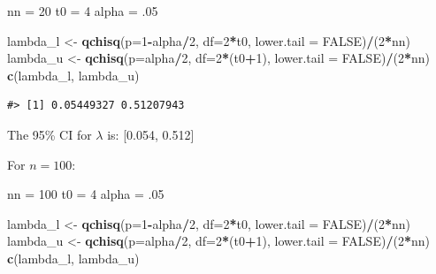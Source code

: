 \documentclass[11pt,]{article}
\newenvironment{Shaded}{\begin{snugshade}}{\end{snugshade}}
\newcommand{\DataTypeTok}[1]{\textcolor[rgb]{0.13,0.29,0.53}{#1}}
\newcommand{\DecValTok}[1]{\textcolor[rgb]{0.00,0.00,0.81}{#1}}
\newcommand{\FloatTok}[1]{\textcolor[rgb]{0.00,0.00,0.81}{#1}}
\newcommand{\KeywordTok}[1]{\textcolor[rgb]{0.13,0.29,0.53}{\textbf{#1}}}
\newcommand{\NormalTok}[1]{#1}
\newcommand{\OperatorTok}[1]{\textcolor[rgb]{0.81,0.36,0.00}{\textbf{#1}}}
\newcommand{\OtherTok}[1]{\textcolor[rgb]{0.56,0.35,0.01}{#1}}
\newcommand{\StringTok}[1]{\textcolor[rgb]{0.31,0.60,0.02}{#1}}
\begin{document}
\begin{Shaded}
\begin{Highlighting}[]
\NormalTok{nn =}\StringTok{ }\DecValTok{20}
\NormalTok{t0 =}\StringTok{ }\DecValTok{4}
\NormalTok{alpha =}\StringTok{ }\FloatTok{.05}

\NormalTok{lambda_l <-}\StringTok{ }\KeywordTok{qchisq}\NormalTok{(}\DataTypeTok{p=}\DecValTok{1}\OperatorTok{-}\NormalTok{alpha}\OperatorTok{/}\DecValTok{2}\NormalTok{, }\DataTypeTok{df=}\DecValTok{2}\OperatorTok{*}\NormalTok{t0, }\DataTypeTok{lower.tail =} \OtherTok{FALSE}\NormalTok{)}\OperatorTok{/}\NormalTok{(}\DecValTok{2}\OperatorTok{*}\NormalTok{nn)}
\NormalTok{lambda_u <-}\StringTok{ }\KeywordTok{qchisq}\NormalTok{(}\DataTypeTok{p=}\NormalTok{alpha}\OperatorTok{/}\DecValTok{2}\NormalTok{, }\DataTypeTok{df=}\DecValTok{2}\OperatorTok{*}\NormalTok{(t0}\OperatorTok{+}\DecValTok{1}\NormalTok{), }\DataTypeTok{lower.tail =} \OtherTok{FALSE}\NormalTok{)}\OperatorTok{/}\NormalTok{(}\DecValTok{2}\OperatorTok{*}\NormalTok{nn)}
\KeywordTok{c}\NormalTok{(lambda_l, lambda_u)}
\end{Highlighting}
\end{Shaded}

\begin{verbatim}
#> [1] 0.05449327 0.51207943
\end{verbatim}

The 95\% CI for \(\lambda\) is: {[}0.054, 0.512{]}

For \(n=100\):

\begin{Shaded}
\begin{Highlighting}[]
\NormalTok{nn =}\StringTok{ }\DecValTok{100}
\NormalTok{t0 =}\StringTok{ }\DecValTok{4}
\NormalTok{alpha =}\StringTok{ }\FloatTok{.05}

\NormalTok{lambda_l <-}\StringTok{ }\KeywordTok{qchisq}\NormalTok{(}\DataTypeTok{p=}\DecValTok{1}\OperatorTok{-}\NormalTok{alpha}\OperatorTok{/}\DecValTok{2}\NormalTok{, }\DataTypeTok{df=}\DecValTok{2}\OperatorTok{*}\NormalTok{t0, }\DataTypeTok{lower.tail =} \OtherTok{FALSE}\NormalTok{)}\OperatorTok{/}\NormalTok{(}\DecValTok{2}\OperatorTok{*}\NormalTok{nn)}
\NormalTok{lambda_u <-}\StringTok{ }\KeywordTok{qchisq}\NormalTok{(}\DataTypeTok{p=}\NormalTok{alpha}\OperatorTok{/}\DecValTok{2}\NormalTok{, }\DataTypeTok{df=}\DecValTok{2}\OperatorTok{*}\NormalTok{(t0}\OperatorTok{+}\DecValTok{1}\NormalTok{), }\DataTypeTok{lower.tail =} \OtherTok{FALSE}\NormalTok{)}\OperatorTok{/}\NormalTok{(}\DecValTok{2}\OperatorTok{*}\NormalTok{nn)}
\KeywordTok{c}\NormalTok{(lambda_l, lambda_u)}
\end{Highlighting}
\end{Shaded}
\end{document}
